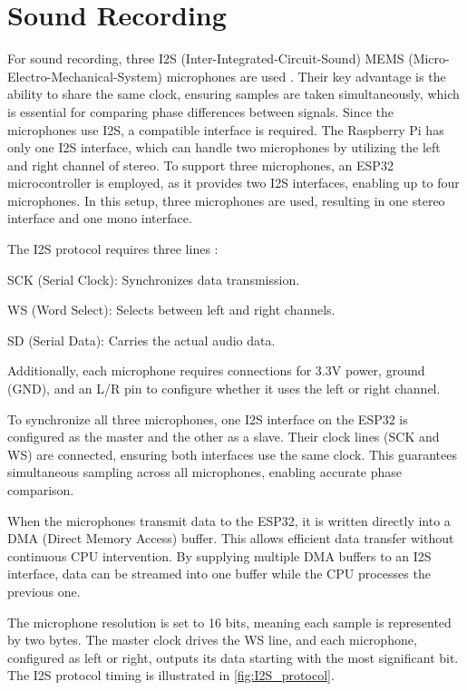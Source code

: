 \section{Sound Recording}
\label{sec:sound_recording}
For sound recording, three I2S (Inter-Integrated-Circuit-Sound) MEMS (Micro-Electro-Mechanical-System) microphones are used \cite{DFRobot_Fermion_I2S_MEMS_Microphone}. Their key advantage is the ability to share the same clock, ensuring samples are taken simultaneously, which is essential for comparing phase differences between signals. Since the microphones use I2S, a compatible interface is required. The Raspberry Pi has only one I2S interface, which can handle two microphones by utilizing the left and right channel of stereo. To support three microphones, an ESP32 microcontroller is employed, as it provides two I2S interfaces, enabling up to four microphones. In this setup, three microphones are used, resulting in one stereo interface and one mono interface.

The I2S protocol requires three lines \cite{ESP32_I2S}:

SCK (Serial Clock): Synchronizes data transmission.

WS (Word Select): Selects between left and right channels.

SD (Serial Data): Carries the actual audio data.

Additionally, each microphone requires connections for 3.3V power, ground (GND), and an L/R pin to configure whether it uses the left or right channel.

To synchronize all three microphones, one I2S interface on the ESP32 is configured as the master and the other as a slave. Their clock lines (SCK and WS) are connected, ensuring both interfaces use the same clock. This guarantees simultaneous sampling across all microphones, enabling accurate phase comparison.

When the microphones transmit data to the ESP32, it is written directly into a DMA (Direct Memory Access) buffer. This allows efficient data transfer without continuous CPU intervention. By supplying multiple DMA buffers to an I2S interface, data can be streamed into one buffer while the CPU processes the previous one.

The microphone resolution is set to 16 bits, meaning each sample is represented by two bytes. The master clock drives the WS line, and each microphone, configured as left or right, outputs its data starting with the most significant bit. The I2S protocol timing is illustrated in \cref{fig:I2S_protocol}.

